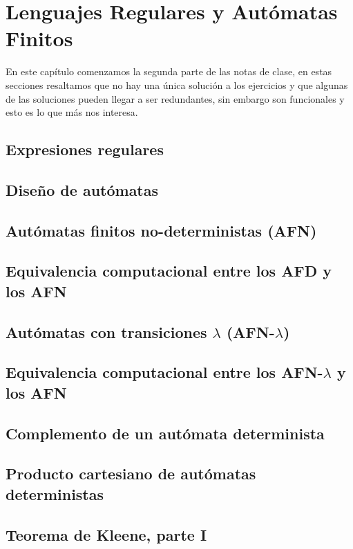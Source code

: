 \documentclass[12pt,a4paper]{book}
\begin{document}
\chapter{Lenguajes Regulares y Autómatas Finitos}
En este capítulo comenzamos la segunda parte de las notas de clase, en estas secciones resaltamos que no hay una única solución a los ejercicios y que algunas de las soluciones pueden llegar a ser redundantes, sin embargo son funcionales y esto es lo que más nos interesa.
    \section{Expresiones regulares}
        
    \section{Diseño de autómatas}
        
    \section{Autómatas finitos no-deterministas (AFN)}
        
    \section{Equivalencia computacional entre los AFD y los AFN}
        
    \section{Autómatas con transiciones \texorpdfstring{\boldmath$\lambda$}{lambda} (AFN-\texorpdfstring{\boldmath$\lambda$}{lambda})}    
    \section{Equivalencia computacional entre los AFN-\texorpdfstring{\boldmath$\lambda$}{lambda} y los AFN}
        
    \section{Complemento de un autómata determinista}
        
    \section{Producto cartesiano de autómatas deterministas}
        
    \section{Teorema de Kleene, parte I}
        
\end{document}
